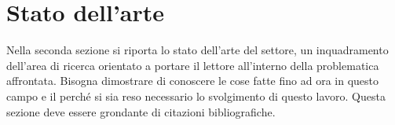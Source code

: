\chapter{Stato dell'arte}
\label{capitolo2}

Nella seconda sezione si riporta lo stato dell'arte del settore, un inquadramento dell'area di ricerca orientato a portare il lettore all'interno della problematica affrontata. Bisogna dimostrare di conoscere le cose fatte fino ad ora in questo campo e il perché si sia reso necessario lo svolgimento di questo lavoro. Questa sezione deve essere grondante di citazioni bibliografiche.
